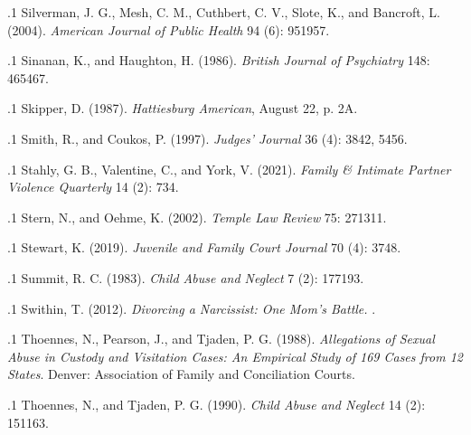\documentclass[11pt, twoside]{article}
\begin{document}
{{\p.1{%
Silverman, J. G., Mesh, C. M., Cuthbert, C. V., Slote, K., and Bancroft, L.
(2004).  \textit{American Journal of Public Health} 94 (6):
951\ndash{}957.
}%

\p.1{%
Sinanan, K., and Haughton, H. (1986).  \textit{British Journal of Psychiatry} 148: 465\ndash{}467.
}%

\p.1{%
Skipper, D. (1987).  \textit{Hattiesburg American}, August
22, p. 2A.
}%

\p.1{%
Smith, R., and Coukos, P. (1997).  \textit{Judges’ Journal} 36
(4): 38\ndash{}42, 54\ndash{}56.
}%

\p.1{%
Stahly, G. B., Valentine, C., and York, V. (2021). 
\textit{Family \& Intimate Partner Violence Quarterly} 14 (2): 7\ndash{}34.
}%

\p.1{%
Stern, N., and Oehme, K. (2002).  \textit{Temple Law Review} 75: 271\ndash{}311.
}%

\p.1{%
Stewart, K. (2019).  \textit{Juvenile and Family Court Journal} 70 (4): 37\ndash{}48.
}%

\p.1{%
Summit, R. C. (1983).  \textit{Child
Abuse and Neglect} 7 (2): 177\ndash{}193.
}%

\p.1{%
Swithin, T. (2012). \textit{Divorcing a Narcissist: One Mom’s Battle.}
.
}%

\p.1{%
Thoennes, N., Pearson, J., and Tjaden, P. G. (1988). \textit{Allegations of Sexual Abuse in Custody and Visitation Cases: An Empirical Study of 169 Cases from 12 States}. Denver:
Association of Family and Conciliation Courts.
}%

\p.1{%
Thoennes, N., and Tjaden, P. G. (1990).  \textit{Child Abuse and Neglect}
14 (2): 151\ndash{}163.
}%

}}
\end{document}
